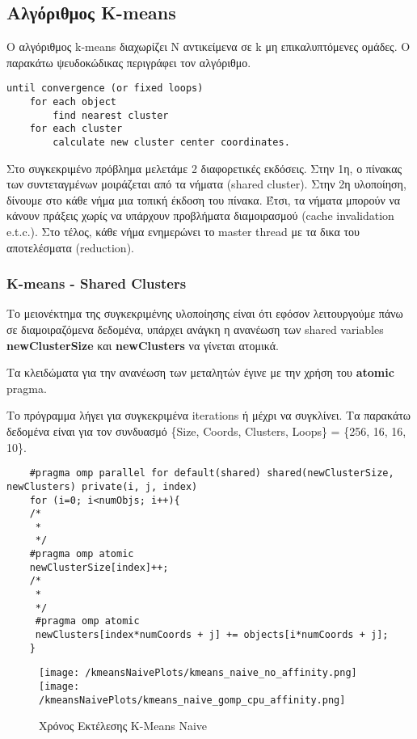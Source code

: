 \documentclass[letterpaper,12pt]{article}
\begin{document}
\subsection{Αλγόριθμος K-means}

Ο αλγόριθμος k-means διαχωρίζει N αντικείμενα σε k μη επικαλυπτόμενες ομάδες. Ο παρακάτω ψευδοκώδικας περιγράφει τον αλγόριθμο.

\begin{lstlisting}
until convergence (or fixed loops)
    for each object
        find nearest cluster
    for each cluster
        calculate new cluster center coordinates.
\end{lstlisting}

Στο συγκεκριμένο πρόβλημα μελετάμε 2 διαφορετικές εκδόσεις. Στην 1η, ο πίνακας των συντεταγμένων μοιράζεται από τα νήματα (shared cluster).
Στην 2η υλοποίηση, δίνουμε στο κάθε νήμα μια τοπική έκδοση του πίνακα. Έτσι, τα νήματα μπορούν να κάνουν πράξεις
χωρίς να υπάρχουν προβλήματα διαμοιρασμού (cache invalidation e.t.c.). Στο τέλος, κάθε νήμα ενημερώνει το
master thread με τα δικα του αποτελέσματα (reduction).

\subsubsection{K-means - Shared Clusters}

Το μειονέκτημα της συγκεκριμένης υλοποίησης είναι ότι εφόσον λειτουργούμε πάνω σε διαμοιραζόμενα δεδομένα, υπάρχει
ανάγκη η ανανέωση των shared variables \textbf{newClusterSize} και \textbf{newClusters} να γίνεται ατομικά.

Τα κλειδώματα για την ανανέωση των μεταλητών έγινε με την χρήση του \textbf{atomic} pragma.

Το πρόγραμμα λήγει για συγκεκριμένα iterations ή μέχρι να συγκλίνει. Τα παρακάτω δεδομένα είναι για τον συνδυασμό
\{Size, Coords, Clusters, Loops\} = \{256, 16, 16, 10\}.

\begin{lstlisting}
    #pragma omp parallel for default(shared) shared(newClusterSize, newClusters) private(i, j, index)
    for (i=0; i<numObjs; i++){
    /*
     *
     */
    #pragma omp atomic
    newClusterSize[index]++;
    /*
     *
     */
     #pragma omp atomic
     newClusters[index*numCoords + j] += objects[i*numCoords + j];
    }
\end{lstlisting}

\begin{figure}[H]
    \centering
    \texttt{[image: /kmeansNaivePlots/kmeans\_naive\_no\_affinity.png]}
    \texttt{[image: /kmeansNaivePlots/kmeans\_naive\_gomp\_cpu\_affinity.png]}
    \caption{Χρόνος Εκτέλεσης K-Means Naive}
    \label{fig:Χρόνος Εκτέλεσης K-Means Naive}
\end{figure}
\end{document}
